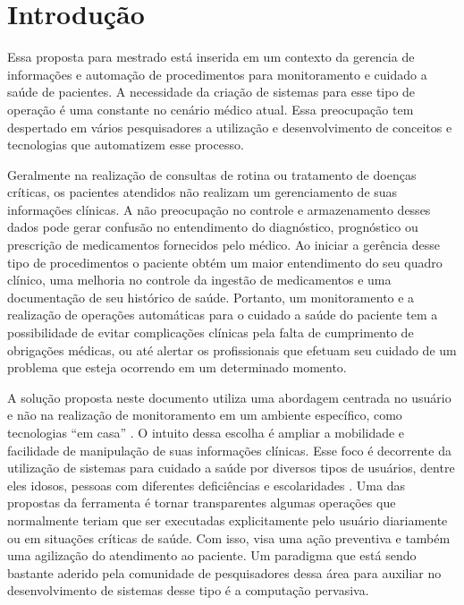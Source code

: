 \documentclass[a4paper,10pt]{article}
\begin{document}
\Capa
\newpage
\renewcommand\contentsname{Sumário}
\tableofcontents
\thispagestyle{empty}
\newpage

\section{Introdução}


Essa proposta para mestrado está inserida em um contexto da gerencia de informações 
e automação de procedimentos para monitoramento e cuidado a saúde de pacientes.
A necessidade da criação de sistemas para esse tipo de operação 
é uma constante no cenário médico atual. Essa preocupação tem despertado em vários 
pesquisadores a utilização e desenvolvimento de conceitos e tecnologias que automatizem 
esse processo.

Geralmente na realização de consultas de rotina ou tratamento de doenças críticas, os 
pacientes atendidos não realizam um gerenciamento de suas informações clínicas. A não 
preocupação no controle e armazenamento desses dados pode gerar confusão no entendimento 
do diagnóstico, prognóstico ou prescrição de medicamentos fornecidos pelo médico. Ao 
iniciar a gerência desse tipo de procedimentos o paciente  obtém um maior entendimento 
do seu quadro clínico, uma melhoria no controle da ingestão de medicamentos e uma 
documentação de seu histórico de saúde. Portanto, um monitoramento e a realização de 
operações automáticas para o cuidado a saúde do paciente tem a possibilidade de evitar 
complicações clínicas pela falta de cumprimento de obrigações médicas, ou até alertar 
os profissionais que efetuam seu cuidado de um problema que esteja ocorrendo em um 
determinado momento.

A solução proposta neste documento utiliza uma abordagem centrada no usuário e não na 
realização de monitoramento em um ambiente específico, como tecnologias “em casa” \cite{Dearden}. 
O intuito dessa escolha é ampliar a mobilidade e facilidade de manipulação de suas informações clínicas. 
Esse foco é decorrente da utilização de sistemas para cuidado a saúde por diversos tipos de usuários, 
dentre eles idosos, pessoas com diferentes deficiências e escolaridades \cite{Mulder}. 
Uma das propostas da ferramenta é tornar transparentes algumas operações que normalmente teriam que ser executadas 
explicitamente pelo usuário diariamente ou em situações críticas de saúde. Com isso, visa uma 
ação preventiva e também uma agilização do atendimento ao paciente. Um paradigma que está sendo 
bastante aderido pela comunidade de pesquisadores dessa área para auxiliar no desenvolvimento 
de sistemas desse tipo é a computação pervasiva. 
\end{document}
